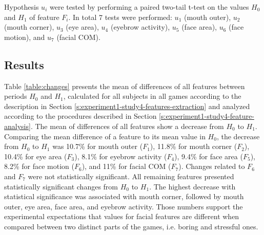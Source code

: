 Hypothesis $u_i$ were tested by performing a paired two-tail t-test on the values $H_0$ and $H_1$ of feature $F_i$. In total 7 tests were performed: $u_1$ (mouth outer), $u_2$ (mouth corner), $u_3$ (eye area), $u_4$ (eyebrow activity), $u_5$ (face area), $u_6$ (face motion), and $u_7$ (facial COM).

\subsection{Results}

Table \ref{table:changes} presents the mean of differences of all features between periods $H_0$ and $H_1$, calculated for all subjects in all games according to the description in Section \ref{s:experiment1-study4-features-extraction} and analyzed according to the procedures described in Section \ref{s:experiment1-study4-feature-analysis}. The mean of differences of all features show a decrease from $H_0$ to $H_1$. Comparing the mean difference of a feature to its mean value in $H_0$, the decrease from $H_0$ to $H_1$ was 10.7\% for mouth outer ($F_1$), 11.8\% for mouth corner ($F_2$), 10.4\% for eye area ($F_3$), 8.1\% for eyebrow activity ($F_4$), 9.4\% for face area ($F_5$), 8.2\% for face motion ($F_6$), and 11\% for facial COM ($F_7$). Changes related to $F_6$ and $F_7$ were not statistically significant. All remaining features presented statistically significant changes from $H_0$ to $H_1$. The highest decrease with statistical significance was associated with mouth corner, followed by mouth outer, eye area, face area, and eyebrow activity. Those numbers support the experimental expectations that values for facial features are different when compared between two distinct parts of the games, i.e. boring and stressful ones.


